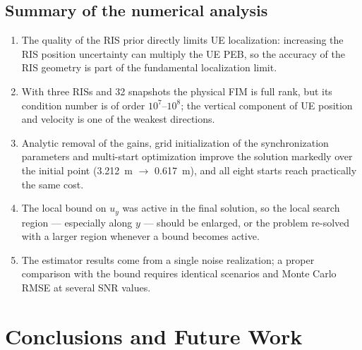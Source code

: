 \documentclass[11pt,a4paper]{article}
\begin{document}
\subsection{Summary of the numerical analysis}
\begin{enumerate}
\item The quality of the RIS prior directly limits UE localization: increasing the RIS position uncertainty can
multiply the UE PEB, so the accuracy of the RIS geometry is part of the fundamental localization limit.
\item With three RISs and 32 snapshots the physical FIM is full rank, but its condition number is of order
$10^{7}$--$10^{8}$; the vertical component of UE position and velocity is one of the weakest directions.
\item Analytic removal of the gains, grid initialization of the synchronization parameters and multi-start
optimization improve the solution markedly over the initial point (3.212~m $\to$ 0.617~m), and all eight starts
reach practically the same cost.
\item The local bound on $u_y$ was active in the final solution, so the local search region --- especially along
$y$ --- should be enlarged, or the problem re-solved with a larger region whenever a bound becomes active.
\item The estimator results come from a single noise realization; a proper comparison with the bound requires
identical scenarios and Monte Carlo RMSE at several SNR values.
\end{enumerate}

\section{Conclusions and Future Work}
\end{document}
